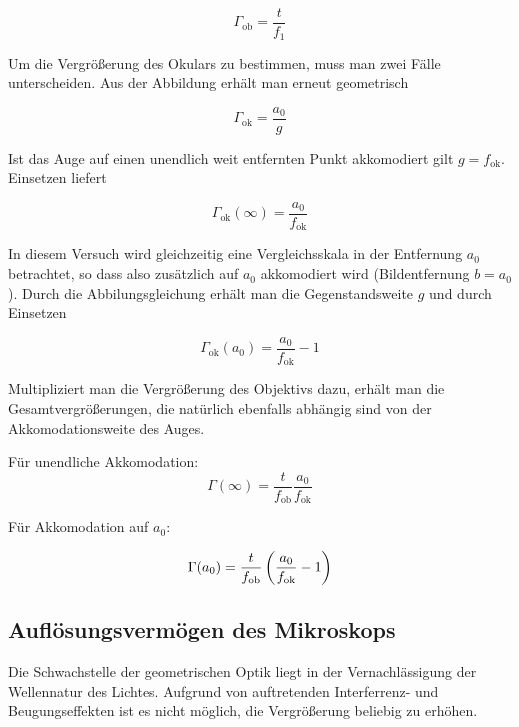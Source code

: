 \documentclass[a4paper,german,12pt,smallheadings]{scrartcl}
\begin{document}
\begin{equation}
  \Gamma_\text{ob} = \frac{t}{f_1}
\end{equation}


Um die Vergrößerung des Okulars zu bestimmen, muss man zwei Fälle
unterscheiden. Aus der Abbildung erhält man erneut geometrisch

\begin{equation}
  \Gamma_\text{ok} = \frac{a_0}{g}
\end{equation}

Ist das Auge auf einen unendlich weit entfernten Punkt akkomodiert gilt $g =
f_\text{ok}$. Einsetzen liefert

\begin{equation}
  \Gamma_\text{ok}(\infty) = \frac{a_0}{f_\text{ok}}
\end{equation}

In diesem Versuch wird gleichzeitig eine Vergleichsskala in der Entfernung
$a_0$ betrachtet, so dass also zusätzlich auf $a_0$ akkomodiert wird
(Bildentfernung $b = a_0$). Durch die Abbilungsgleichung erhält man die
Gegenstandsweite $g$ und durch Einsetzen

\begin{equation}
  \Gamma_\text{ok}(a_0) = \frac{a_0}{f_\text{ok}} - 1
\end{equation}

Multipliziert man die Vergrößerung des Objektivs dazu, erhält man die
Gesamtvergrößerungen, die natürlich ebenfalls abhängig sind von der
Akkomodationsweite des Auges.

Für unendliche Akkomodation:
\begin{equation}
  \Gamma(\infty) = \frac{t}{f_\text{ob}} \frac{a_0}{f_\text{ok}}
  \label{eq:vergr_inf}
\end{equation}

Für Akkomodation auf $a_0$:

\begin{equation}
  \Gamma(a_0) = \frac{t}{f_\text{ob}} \del{\frac{a_0}{f_\text{ok}} - 1}
  \label{eq:vergr}
\end{equation}

\subsection{Auflösungsvermögen des Mikroskops}

Die Schwachstelle der geometrischen Optik liegt in der Vernachlässigung der
Wellennatur des Lichtes. Aufgrund von auftretenden Interferrenz- und
Beugungseffekten ist es nicht möglich, die Vergrößerung beliebig zu erhöhen.
\end{document}
